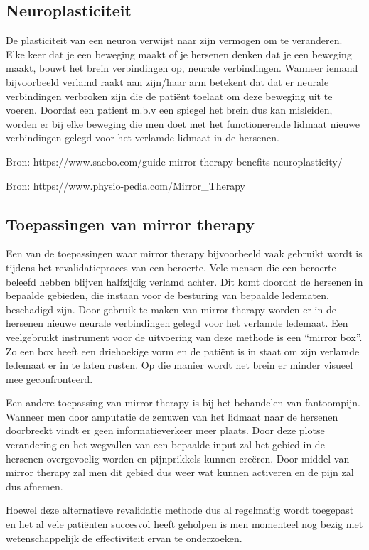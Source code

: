 \subsection{Neuroplasticiteit}
De plasticiteit van een neuron verwijst naar zijn vermogen om te veranderen. Elke keer dat je een beweging maakt of je hersenen denken dat je een beweging maakt, bouwt het brein verbindingen op, neurale verbindingen. Wanneer iemand bijvoorbeeld verlamd raakt aan zijn/haar arm betekent dat dat er neurale verbindingen verbroken zijn die de patiënt toelaat om deze beweging uit te voeren. Doordat een patient m.b.v een spiegel het brein dus kan misleiden, worden er bij elke beweging die men doet met het functionerende lidmaat nieuwe verbindingen gelegd voor het verlamde lidmaat in de hersenen.

Bron: https://www.saebo.com/guide-mirror-therapy-benefits-neuroplasticity/

Bron: https://www.physio-pedia.com/Mirror\_Therapy

\subsection{Toepassingen van mirror therapy}
Een van de toepassingen waar mirror therapy bijvoorbeeld vaak gebruikt wordt is tijdens het revalidatieproces van een beroerte.  Vele mensen die een beroerte beleefd hebben blijven halfzijdig verlamd achter. Dit komt doordat de hersenen in bepaalde gebieden, die instaan voor de besturing van bepaalde ledematen, beschadigd zijn. Door gebruik te maken van mirror therapy worden er in de hersenen nieuwe neurale verbindingen gelegd voor het verlamde ledemaat. Een veelgebruikt instrument voor de uitvoering van deze methode is een “mirror box”. Zo een box heeft een driehoekige vorm en de patiënt is in staat om zijn verlamde ledemaat er in te laten rusten. Op die manier wordt het brein er minder visueel mee geconfronteerd.



Een andere toepassing van mirror therapy is bij het behandelen van fantoompijn. Wanneer men door amputatie de zenuwen van het lidmaat naar de hersenen doorbreekt vindt er geen informatieverkeer meer plaats. Door deze plotse verandering en het wegvallen van een bepaalde input zal het gebied in de hersenen overgevoelig worden en pijnprikkels kunnen creëren. Door middel van mirror therapy zal men dit gebied dus weer wat kunnen activeren en de pijn zal dus afnemen.

Hoewel deze alternatieve revalidatie methode dus al regelmatig wordt toegepast en het al vele patiënten succesvol heeft geholpen is men momenteel nog bezig met wetenschappelijk de effectiviteit ervan te onderzoeken.

